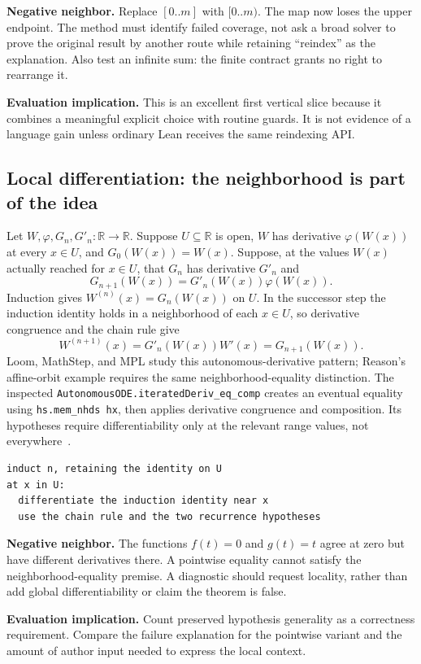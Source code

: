 \documentclass[11pt,letterpaper]{article}
\newcommand{\code}[1]{\nolinkurl{#1}}
\newcommand{\R}{\mathbb R}
\begin{document}
\textbf{Negative neighbor.} Replace \([0..m]\) with \([0..m)\). The map now loses
the upper endpoint. The method must identify failed coverage, not ask a broad
solver to prove the original result by another route while retaining ``reindex''
as the explanation. Also test an infinite sum: the finite contract grants no
right to rearrange it.

\textbf{Evaluation implication.} This is an excellent first vertical slice because
it combines a meaningful explicit choice with routine guards. It is not evidence
of a language gain unless ordinary Lean receives the same reindexing API.

\subsection{Local differentiation: the neighborhood is part of the idea}
Let \(W,\varphi,G_n,G'_n:\R\to\R\). Suppose \(U\subseteq\R\) is open,
\(W\) has derivative \(\varphi(W(x))\) at every \(x\in U\), and
\(G_0(W(x))=W(x)\). Suppose, at the values \(W(x)\) actually reached for
\(x\in U\), that \(G_n\) has derivative \(G'_n\) and
\[
 G_{n+1}(W(x))=G'_n(W(x))\varphi(W(x)).
\]
Induction gives \(W^{(n)}(x)=G_n(W(x))\) on \(U\). In the successor step the
induction identity holds in a neighborhood of each \(x\in U\), so derivative
congruence and the chain rule give
\[
 W^{(n+1)}(x)=G'_n(W(x))W'(x)=G_{n+1}(W(x)).
\]
Loom, MathStep, and MPL study this autonomous-derivative pattern; Reason's affine-orbit
example requires the same neighborhood-equality distinction. The inspected
\code{AutonomousODE.iteratedDeriv_eq_comp} creates an eventual equality using
\code{hs.mem_nhds hx}, then applies derivative congruence and composition.
Its hypotheses require differentiability only at the relevant range values,
not everywhere~\cite{p-ode}.

\begin{lstlisting}
induct n, retaining the identity on U
at x in U:
  differentiate the induction identity near x
  use the chain rule and the two recurrence hypotheses
\end{lstlisting}

\textbf{Negative neighbor.} The functions \(f(t)=0\) and \(g(t)=t\) agree at
zero but have different derivatives there. A pointwise equality cannot satisfy
the neighborhood-equality premise. A diagnostic should request locality, rather
than add global differentiability or claim the theorem is false.

\textbf{Evaluation implication.} Count preserved hypothesis generality as a
correctness requirement. Compare the failure explanation for the pointwise
variant and the amount of author input needed to express the local context.
\end{document}
